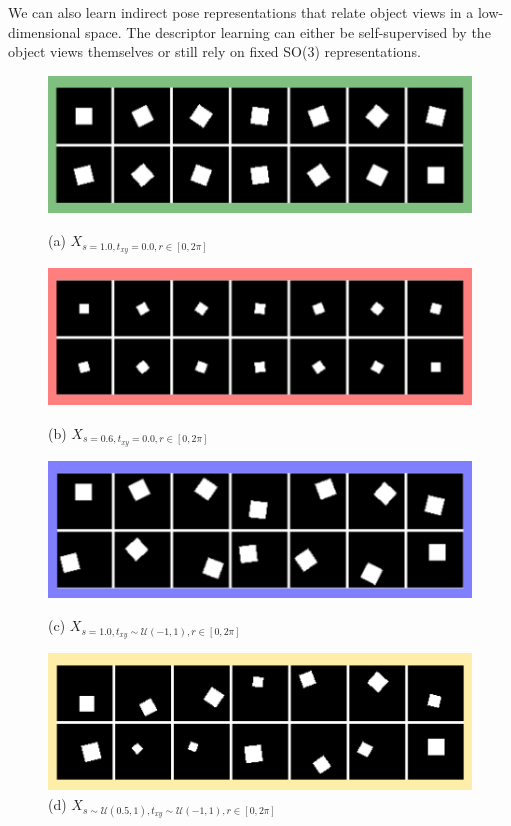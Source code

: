We can also learn indirect pose representations that relate object views in a low-dimensional space. The descriptor learning can either be self-supervised by the object views themselves or still rely on fixed SO(3) representations.
\begin{figure}[t]
	\centering
	\begin{minipage}{0.454\linewidth}
		\centering
		\captionsetup{justification=centering,font=scriptsize,aboveskip=0.15cm,belowskip=0.25cm}
		\includegraphics[width=0.74\linewidth]{y_new.png}
		\caption*{\scriptsize{(a) $X_{s=1.0,t_{xy}=0.0,r \in [0,2\pi]}$}}
		\includegraphics[width=0.74\linewidth]{scale_new.png}
		\caption*{\scriptsize{(b) $X_{s=0.6,t_{xy}=0.0,r \in [0,2\pi]}$}}
		\includegraphics[width=0.74\linewidth]{trans_new.png}
		\caption*{\scriptsize{(c) $X_{s=1.0,t_{xy} \sim \mathcal{U}(-1,1),r \in [0,2\pi]}$}}
		\includegraphics[width=0.74\linewidth]{rand_new.png}
		\caption*{\scriptsize{(d) $X_{s\sim\mathcal{U}(0.5,1),t_{xy} \sim \mathcal{U}(-1,1),r \in [0,2\pi]}$}}
	\end{minipage}%
	\begin{minipage}{0.454\linewidth}		
		\captionsetup{justification=centering,aboveskip=0.03cm,belowskip=0.12cm}

\end{minipage}
\end{figure}

